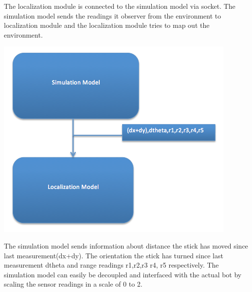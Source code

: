 \documentclass[12pt]{article}
\begin{document}
The localization module is connected to the simulation model via socket. The simulation model sends the readings it observer from the environment to localization module and the localization module tries to map out the environment.
\begin{center} \includegraphics[scale=0.4]{p7} \end{center}

The simulation model sends information about distance the stick has moved since last measurement(dx+dy). The orientation the stick has turned since last measurement dtheta and range readings r1,r2,r3 r4, r5 respectively. The simulation model can easily be decoupled and interfaced with the actual bot by scaling the sensor readings in a scale of 0 to 2.
\end{document}
